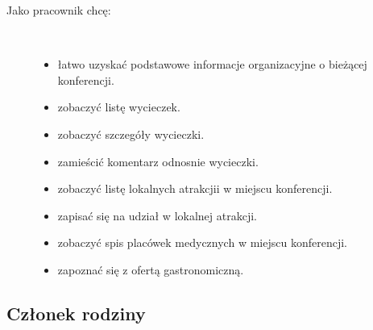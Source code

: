 \begin{description}
  \item[Jako pracownik chcę:] \hfill \\
  \begin{itemize}
    \item łatwo uzyskać podstawowe informacje organizacyjne o bieżącej konferencji.\\
    \item zobaczyć listę wycieczek.\\
    \item zobaczyć szczegóły wycieczki.\\
    \item zamieścić komentarz odnosnie wycieczki.\\
    \item zobaczyć listę lokalnych atrakcjii w miejscu konferencji.\\
    \item zapisać się na udział w lokalnej atrakcji.\\
    \item zobaczyć spis placówek medycznych w miejscu konferencji.\\
    \item zapoznać się z ofertą gastronomiczną.\\
  \end{itemize}

\end{description}




\subsection{Członek rodziny}

